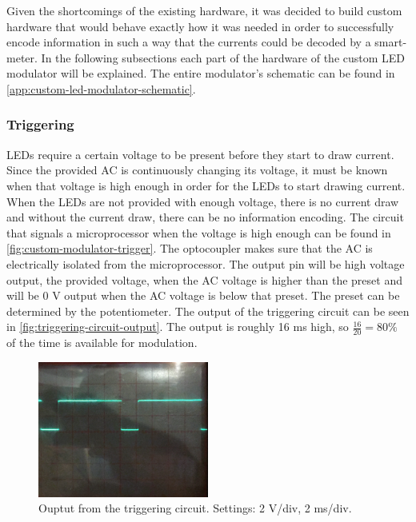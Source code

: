 Given the shortcomings of the existing hardware, it was decided to build custom hardware that would behave exactly how it was needed in order to successfully encode information in such a way that the currents could be decoded by a smart-meter.
In the following subsections each part of the hardware of the custom LED modulator will be explained.
The entire modulator's schematic can be found in \autoref{app:custom-led-modulator-schematic}.



	\subsubsection{Triggering}

	LEDs require a certain voltage to be present before they start to draw current.
	Since the provided AC is continuously changing its voltage, it must be known when that voltage is high enough in order for the LEDs to start drawing current.
	When the LEDs are not provided with enough voltage, there is no current draw and without the current draw, there can be no information encoding.
	The circuit that signals a microprocessor when the voltage is high enough can be found in \autoref{fig:custom-modulator-trigger}.
	The optocoupler makes sure that the AC is electrically isolated from the microprocessor.
	The output pin will be high voltage output, the provided voltage, when the AC voltage is higher than the preset and will be 0 V output when the AC voltage is below that preset.
	The preset can be determined by the potentiometer.
	The output of the triggering circuit can be seen in \autoref{fig:triggering-circuit-output}.
	The output is roughly 16 ms high, so $\frac{16}{20} = 80 \%$ of the time is available for modulation.


	\begin{figure}[htb]
		\centering
		\includegraphics[angle=0,width=0.5\textwidth]{chapters/hardware-chapters/triggering-circuit-output.png}
		\caption{Ouptut from the triggering circuit. Settings: 2 V/div, 2 ms/div.}
		\label{fig:triggering-circuit-output}
	\end{figure}
	


